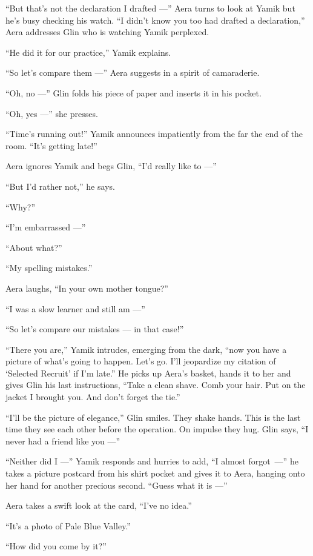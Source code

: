 \documentclass[twoside,11pt,openany]{book}
\begin{document}
``But that's not the declaration I drafted ---'' Aera turns to look at Yamik but he's busy
checking his watch. ``I didn't know you too had drafted a declaration,'' Aera addresses Glin
who is watching Yamik perplexed.

``He did it for our practice,'' Yamik explains.

``So let's compare them ---'' Aera suggests in a spirit of camaraderie.

``Oh, no ---'' Glin folds his piece of paper and inserts it in his pocket.

``Oh, yes ---'' she presses.

``Time's running out!'' Yamik announces impatiently from the far the end of the room.
``It's getting late!''

Aera ignores Yamik and begs Glin, ``I'd really like to ---''

``But I'd rather not,'' he says.

``Why?''

``I'm embarrassed ---''

``About what?''

``My spelling mistakes.''

Aera laughs, ``In your own mother tongue?''

``I was a slow learner and still am ---''

``So let's compare our mistakes --- in that case!''

``There you are,'' Yamik intrudes, emerging from the dark, ``now you have a picture of
what's going to happen. Let's go. I'll jeopardize my citation of `Selected Recruit' if I'm late.''
He picks up Aera's basket, hands it to her and gives Glin his last instructions, ``Take a clean shave.
Comb your hair. Put on the jacket I brought you. And don't forget the tie.''

``I'll be the picture of elegance,'' Glin smiles. They shake hands. This is the last time they
see each other before the operation. On impulse they hug. Glin says, ``I never had a friend like you ---''

``Neither did I ---'' Yamik responds and hurries to add,
``I almost forgot~---'' he takes a picture postcard from his shirt pocket and
gives it to Aera, hanging onto her hand for another
precious second. ``Guess what it is ---''

Aera takes a swift look at{ }the card, ``I've no idea.''

``It's a photo of Pale Blue Valley.''

``How did you come by it?''
\end{document}
